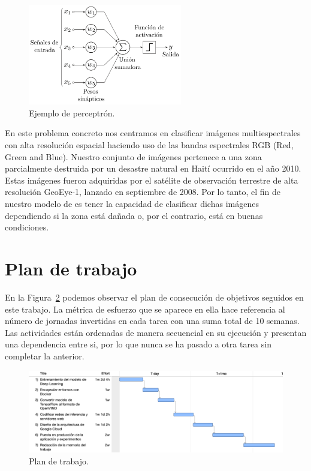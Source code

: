 \begin{figure}[H]
    \centering
    \includegraphics[width=0.6\textwidth]{images/chapter1/perceptron.png}
    \caption{Ejemplo de perceptrón.}
    \label{fig:Perceptrón}
\end{figure}

En este problema concreto nos centramos en clasificar imágenes multiespectrales con alta resolución espacial haciendo uso de las bandas espectrales RGB (Red, Green and Blue).
Nuestro conjunto de imágenes pertenece a una zona parcialmente destruida por un desastre natural en Haití ocurrido en el año 2010.
Estas imágenes fueron adquiridas por el satélite de observación terrestre de alta resolución GeoEye-1, lanzado en septiembre de 2008.
Por lo tanto, el fin de nuestro modelo de  es tener la capacidad de clasificar dichas imágenes dependiendo si la zona está dañada o, por el contrario, está en buenas condiciones.

\section{Plan de trabajo}\label{sec:plan-de-trabajo}
En la Figura~\ref{fig:Plan de trabajo} podemos observar el plan de consecución de objetivos seguidos en este trabajo.
La métrica de esfuerzo que se aparece en ella hace referencia al número de jornadas invertidas en cada tarea con una suma total de 10 semanas.
Las actividades están ordenadas de manera secuencial en su ejecución y presentan una dependencia entre si, por lo que nunca se ha
pasado a otra tarea sin completar la anterior.

\begin{figure}[H]
    \centering
    \includegraphics[width=1\textwidth]{images/chapter1/work_plan.png}
    \caption{Plan de trabajo.}
    \label{fig:Plan de trabajo}
\end{figure}

